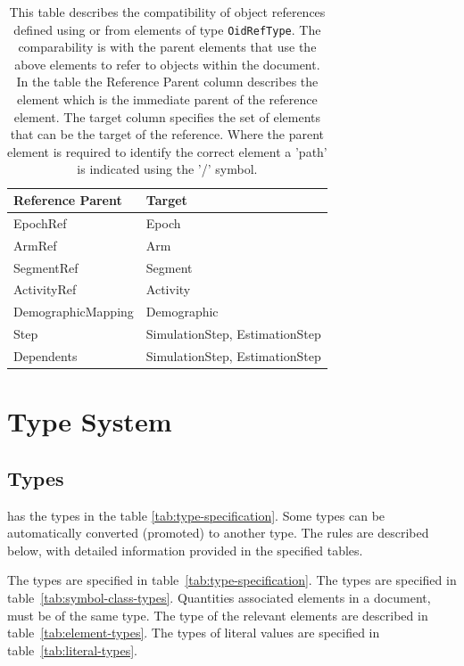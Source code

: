 \begin{table}[ht!]
\begin{center}
\small
\begin{tabular}{ll}\toprule
Reference Parent & Target \\\midrule
EpochRef & Epoch \\
ArmRef & Arm \\
SegmentRef & Segment\\
ActivityRef & Activity \\
DemographicMapping & Demographic\\
Step & SimulationStep, EstimationStep \\
Dependents & SimulationStep, EstimationStep \\\bottomrule
\end{tabular}
\end{center}
\caption{This table describes the compatibility of object
  references defined using  or from elements of type
  \texttt{OidRefType}. The comparability is with the parent elements
  that use the above elements to refer to objects within the \pharmml
  document. In the table the Reference Parent column describes the
  element which is the immediate parent of the reference element. The
  target column specifies the set of elements that can be the target
  of the reference. Where the parent element is required to identify
  the correct element a 'path' is indicated using the '/'
  symbol.}
\label{tab:oidref-targets}
\end{table}%


\section{Type System}

\subsection{Types}

\pharmml has the types in the table \ref{tab:type-specification}. Some types can be
automatically converted (promoted) to another type. The rules are
described below, with detailed information provided in the specified tables.

\begin{valrules}
 The types are specified in table~\ref{tab:type-specification}.
 The types are specified in table~\ref{tab:symbol-class-types}.
 Quantities
associated elements in a \pharmml document, must be of the same
type. The type of the relevant elements are described in
table~\ref{tab:element-types}.
 The types of literal values
are specified in table~\ref{tab:literal-types}.
\end{valrules}

